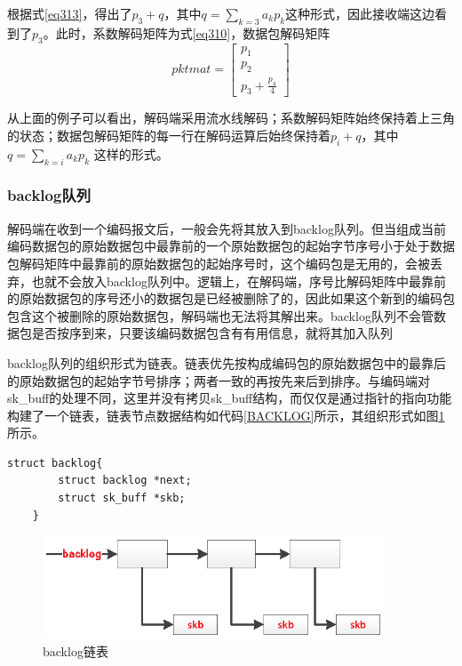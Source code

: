 根据式\ref{eq313}，得出了$p_{3}+q$，其中$q=\sum\limits_{k = 3} {{a_k}{p_k}} $这种形式，因此接收端这边看到了$p_{3}$。此时，系数解码矩阵为式\ref{eq310}，数据包解码矩阵
\begin{equation}
pktmat = \left[ {\begin{array}{*{20}{c}}
	{{p_1}}\\
	{{p_2}}\\
	{{p_3} + \frac{{{p_4}}}{4}}
	\end{array}} \right]
\end{equation}
\par
从上面的例子可以看出，解码端采用流水线解码；系数解码矩阵始终保持着上三角的状态；数据包解码矩阵的每一行在解码运算后始终保持着$p_{i}+q$，其中$q=\sum\limits_{k = i} {{a_k}{p_k}} $ 这样的形式。
\subsubsection{\textbf{backlog队列}}
解码端在收到一个编码报文后，一般会先将其放入到backlog队列。但当组成当前编码数据包的原始数据包中最靠前的一个原始数据包的起始字节序号小于处于数据包解码矩阵中最靠前的原始数据包的起始序号时，这个编码包是无用的，会被丢弃，也就不会放入backlog队列中。逻辑上，在解码端，序号比解码矩阵中最靠前的原始数据包的序号还小的数据包是已经被删除了的，因此如果这个新到的编码包包含这个被删除的原始数据包，解码端也无法将其解出来。backlog队列不会管数据包是否按序到来，只要该编码数据包含有有用信息，就将其加入队列
\par
backlog队列的组织形式为链表。链表优先按构成编码包的原始数据包中的最靠后的原始数据包的起始字节号排序；两者一致的再按先来后到排序。与编码端对sk\_buff的处理不同，这里并没有拷贝sk\_buff结构，而仅仅是通过指针的指向功能构建了一个链表，链表节点数据结构如代码\ref{BACKLOG}所示，其组织形式如图\ref{BACKLOG_EPS}所示。
	\begin{lstlisting}[float,caption=backlog链表节点数据结构,label={BACKLOG},language={[ANSI]C}]
	struct backlog{
		struct backlog *next;
		struct sk_buff *skb;
	}
	\end{lstlisting}

\begin{figure}[htbp]
	\centering
	\includegraphics[width=4in]{figures/backlog.eps}
	\caption{backlog链表}
	\label{BACKLOG_EPS}
\end{figure}
